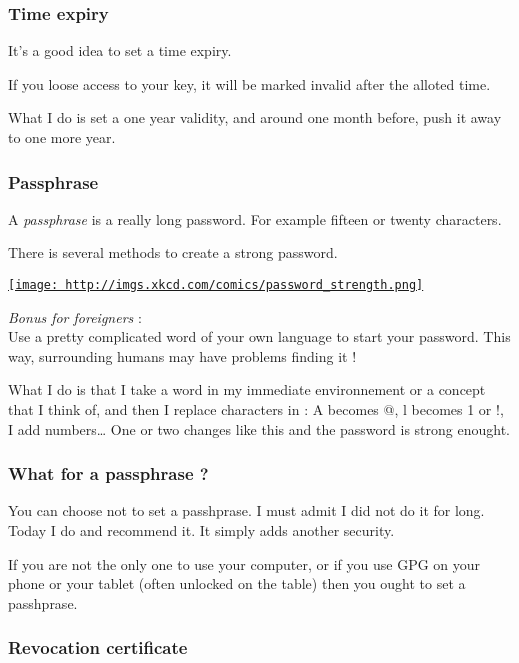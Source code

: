\subsubsection{Time expiry}\label{time-expiry}

It's a good idea to set a time expiry.

If you loose access to your key, it will be marked invalid after the
alloted time.

What I do is set a one year validity, and around one month before, push
it away to one more year.

\subsubsection{Passphrase}\label{passphrase}

A \emph{passphrase} is a really long password. For example fifteen or
twenty characters.

There is several methods to create a strong password.

\href{https://xkcd.com/936/}{\texttt{[image: http://imgs.xkcd.com/comics/password\_strength.png]}}

\emph{Bonus for foreigners} :\\Use a pretty complicated word of your own
language to start your password. This way, surrounding humans may have
problems finding it !

What I do is that I take a word in my immediate environnement or a
concept that I think of, and then I replace characters in : A becomes @,
l becomes 1 or !, I add numbers\ldots{} One or two changes like this and
the password is strong enought.

\subsubsection{What for a passphrase ?}\label{what-for-a-passphrase}

You can choose not to set a passhprase. I must admit I did not do it for
long. Today I do and recommend it. It simply adds another security.

If you are not the only one to use your computer, or if you use GPG on
your phone or your tablet (often unlocked on the table) then you ought
to set a passhprase.

\subsubsection{Revocation certificate}\label{revocation-certificate}

